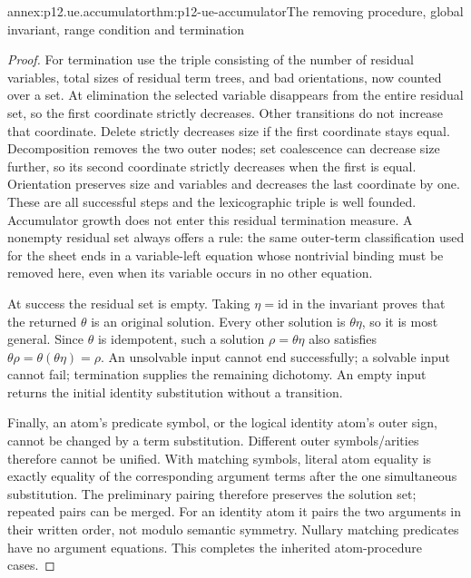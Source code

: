 \begin{annexitem}{annex:p12.ue.accumulator}{thm:p12-ue-accumulator}{The removing procedure, global invariant, range condition and termination}
\begin{proof}
For termination use the triple consisting of the number of residual
variables, total sizes of residual term trees, and bad orientations,
now counted over a set. At elimination the selected variable disappears
from the entire residual set, so the first coordinate strictly decreases.
Other transitions do not increase that coordinate. Delete strictly
decreases size if the first coordinate stays equal. Decomposition
removes the two outer nodes; set coalescence can decrease size further,
so its second coordinate strictly decreases when the first is equal.
Orientation preserves size and variables and decreases the last
coordinate by one. These are all successful steps and the lexicographic
triple is well founded. Accumulator growth does not enter this residual
termination measure. A nonempty residual set always offers a rule:
the same outer-term classification used for the sheet ends in a
variable-left equation whose nontrivial binding must be removed here,
even when its variable occurs in no other equation.

At success the residual set is empty. Taking \(\eta=\mathrm{id}\)
in the invariant proves that the returned \(\theta\) is an original
solution. Every other solution is \(\theta\eta\), so it is most general.
Since \(\theta\) is idempotent, such a solution \(\rho=\theta\eta\)
also satisfies \(\theta\rho=\theta(\theta\eta)=\rho\).
An unsolvable input cannot end successfully; a solvable input cannot
fail; termination supplies the remaining dichotomy. An empty input
returns the initial identity substitution without a transition.

Finally, an atom's predicate symbol, or the logical identity atom's
outer sign, cannot be changed by a term substitution. Different outer
symbols/arities therefore cannot be unified. With matching symbols,
literal atom equality is exactly equality of the corresponding argument
terms after the one simultaneous substitution. The preliminary pairing
therefore preserves the solution set; repeated pairs can be merged.
For an identity atom it pairs the two arguments in their written order,
not modulo semantic symmetry. Nullary matching predicates have no
argument equations. This completes the inherited atom-procedure cases.
\end{proof}
\end{annexitem}

